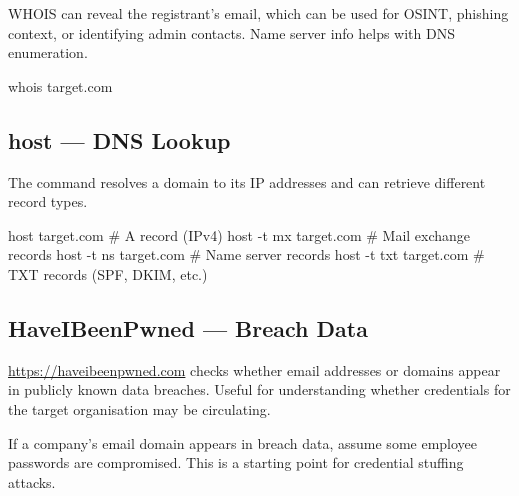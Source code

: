 \begin{whybox}
WHOIS can reveal the registrant's email, which can be used for OSINT, phishing
context, or identifying admin contacts. Name server info helps with DNS enumeration.
\end{whybox}







\begin{termbox}
whois target.com
\end{termbox}

\begin{takebox}

\begin{whybox}

\begin{notebox}


\subsection{host --- DNS Lookup}

The  command resolves a domain to its IP addresses and can retrieve
different record types.

\begin{termbox}
host target.com            # A record (IPv4)
host -t mx target.com      # Mail exchange records
host -t ns target.com      # Name server records
host -t txt target.com     # TXT records (SPF, DKIM, etc.)
\end{termbox}

\subsection{HaveIBeenPwned --- Breach Data}

\url{https://haveibeenpwned.com} checks whether email addresses or domains appear
in publicly known data breaches. Useful for understanding whether credentials for
the target organisation may be circulating.

\begin{notebox}
If a company's email domain appears in breach data, assume some employee passwords
are compromised. This is a starting point for credential stuffing attacks.
\end{notebox}


\end{notebox}
\end{whybox}
\end{takebox}
